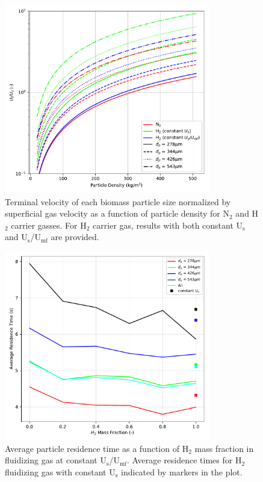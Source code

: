 \begin{figure}[H]
    \centering
    \includegraphics[width=0.8\textwidth]{figures/cfd-constuumf-terminal-vel.pdf}
    \caption{Terminal velocity of each biomass particle size normalized by superficial gas velocity as a function of particle density for N$_2$ and H$_2$ carrier gasses. For H$_2$ carrier gas, results with both constant U$_\text{s}$ and U$_\text{s}$/U$_\text{mf}$ are provided.}
    \label{fig:cfd-constuumf-terminal-vel}
\end{figure}

\begin{figure}[H]
    \centering
    \includegraphics[width=0.8\textwidth]{figures/cfd-constuumf-rtd.pdf}
    \caption{Average particle residence time as a function of H$_2$ mass fraction in fluidizing gas at constant U$_\text{s}$/U$_\text{mf}$. Average residence times for H$_2$ fluidizing gas with constant U$_\text{s}$ indicated by markers in the plot.}
    \label{fig:cfd-constuumf-rtd}
\end{figure}

